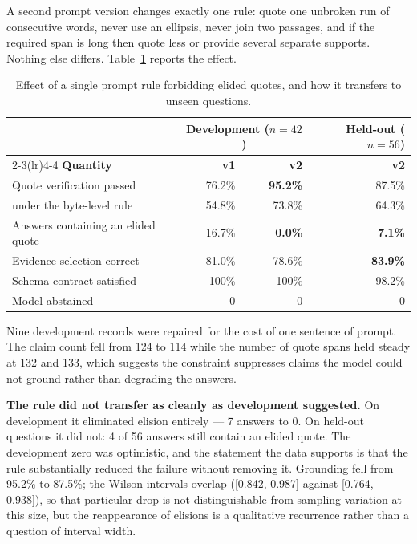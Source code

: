 A second prompt version changes exactly one rule: quote one unbroken run of
consecutive words, never use an ellipsis, never join two passages, and if the
required span is long then quote less or provide several separate supports.
Nothing else differs. Table~\ref{tab:prompt-ablation} reports the effect.

\begin{table}[htbp]
  \centering
  \caption{Effect of a single prompt rule forbidding elided quotes, and how it transfers to unseen questions.}
  \label{tab:prompt-ablation}
  \small
  \begin{tabular}{lrrr}
    \toprule
    & \multicolumn{2}{c}{\textbf{Development} ($n=42$)} & \textbf{Held-out} ($n=56$) \\
    \cmidrule(lr){2-3}\cmidrule(lr){4-4}
    \textbf{Quantity} & \textbf{v1} & \textbf{v2} & \textbf{v2} \\
    \midrule
    Quote verification passed & 76.2\% & \textbf{95.2\%} & 87.5\% \\
    \quad under the byte-level rule & 54.8\% & 73.8\% & 64.3\% \\
    Answers containing an elided quote & 16.7\% & \textbf{0.0\%} & \textbf{7.1\%} \\
    Evidence selection correct & 81.0\% & 78.6\% & \textbf{83.9\%} \\
    Schema contract satisfied & 100\% & 100\% & 98.2\% \\
    Model abstained & 0 & 0 & 0 \\
    \bottomrule
  \end{tabular}
\end{table}

Nine development records were repaired for the cost of one sentence of prompt.
The claim count fell from 124 to 114 while the number of quote spans held steady
at 132 and 133, which suggests the constraint suppresses claims the model could
not ground rather than degrading the answers.

\textbf{The rule did not transfer as cleanly as development suggested.} On
development it eliminated elision entirely --- 7 answers to 0. On held-out
questions it did not: 4 of 56 answers still contain an elided quote. The development zero was optimistic, and the statement the data supports is
that the rule substantially reduced the failure without removing it. Grounding fell from 95.2\%
to 87.5\%; the Wilson intervals overlap ([0.842, 0.987] against [0.764, 0.938]),
so that particular drop is not distinguishable from sampling variation at this
size, but the reappearance of elisions is a qualitative recurrence rather than a
question of interval width.

